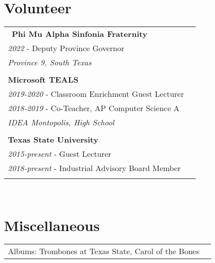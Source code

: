 \documentclass[10pt]{article} %
\newcommand\tab[1][1cm]{\hspace*{#1}}
\begin{document}
\begin{minipage}[t]{0.44\textwidth}
\begin{tabular}{rl}
\end{tabular}\\


\section{Volunteer} 

\begin{tabular}{ll}\
\textbf{Phi Mu Alpha Sinfonia Fraternity}\\
\tab\textit{2022} - Deputy Province Governor\\
\tab\tab\textit {Province 9, South Texas}\\
\\

\textbf{Microsoft TEALS}\\
\tab\textit{2019-2020} - Classroom Enrichment Guest Lecturer\\
\tab\textit{2018-2019} - Co-Teacher, AP Computer Science A\\
\tab\tab\textit {IDEA Montopolis, High School}\\
\\

\textbf{Texas State University}\\
\tab\textit{2015-present} - Guest Lecturer\\
\tab\textit{2018-present} - Industrial Advisory Board Member\\
\\

\end{tabular}\\


\section{Miscellaneous} 

\begin{tabular}{ll}
Albums: Trombones at Texas State, Carol of the Bones \\
\end{tabular}\\

\end{minipage}
\end{document}
